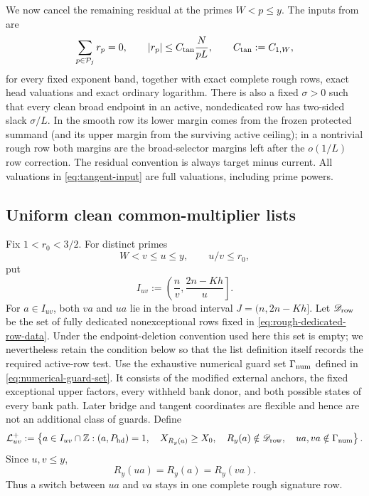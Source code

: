 \documentclass[11pt]{article}
\numberwithin{equation}{section}
\theoremstyle{definition}
\theoremstyle{remark}
\newcommand{\1}{\mathbf 1}
\begin{document}
We now cancel the remaining residual at the primes \(W<p\leq y\).
The inputs from  are
\begin{equation}
 \sum_{p\in\mathcal P_j}r_p=0,\qquad
 |r_p|\leq C_{\rm tan}\frac{N}{pL},
 \qquad C_{\rm tan}:=C_{1,W},
\label{eq:tangent-input}
\end{equation}
for every fixed exponent band, together with exact complete rough rows,
exact head valuations and exact ordinary logarithm.  There is also a fixed
\(\sigma>0\) such that every clean broad endpoint in an active,
nondedicated row has two-sided slack \(\sigma/L\).  In the smooth row its
lower margin comes from the frozen protected summand (and its upper margin
from the surviving active ceiling); in a nontrivial rough row both margins
are the broad-selector margins left after the \(o(1/L)\) row correction.
The residual convention is always target minus current.  All valuations in
\eqref{eq:tangent-input} are full valuations, including prime powers.

\subsection{Uniform clean common-multiplier lists}
\label{subsec:tangent-common-lists}

Fix \(1<r_0<3/2\).  For distinct primes
\[
                 W<v\leq u\leq y,\qquad u/v\leq r_0,
\]
put
\[
 I_{uv}:=\left(\frac nv,\frac{2n-Kh}{u}\right].
\]
For \(a\in I_{uv}\), both \(va\) and \(ua\) lie in the broad interval
\(J=(n,2n-Kh]\).  Let \(\mathscr D_{\rm row}\) be the set of fully
dedicated nonexceptional rows fixed in
\eqref{eq:rough-dedicated-row-data}.  Under the endpoint-deletion convention
used here this set is empty; we nevertheless retain the condition below so
that the list definition itself records the required active-row test.
Use the exhaustive numerical guard set
\(\Gamma_{\rm num}\) defined in \eqref{eq:numerical-guard-set}.  It
consists of the modified external anchors, the fixed exceptional upper
factors, every withheld bank donor, and both possible states of every bank
path.  Later bridge and tangent coordinates are flexible and hence are
not an additional class of guards.  Define
\begin{equation}
 \mathcal L^+_{uv}:=
 \left\{a\in I_{uv}\cap\mathbb Z:
  (a,P_{\rm hd})=1,\quad
  X_{R_y(a)}\geq X_0,\quad
  R_y(a)\notin\mathscr D_{\rm row},\quad
  ua,va\notin\Gamma_{\rm num}\right\}.
\label{eq:tangent-clean-list}
\end{equation}
Since \(u,v\leq y\),
\begin{equation}
                 R_y(ua)=R_y(a)=R_y(va).
\label{eq:tangent-row-identity}
\end{equation}
Thus a switch between \(ua\) and \(va\) stays in one complete rough
signature row.
\end{document}
